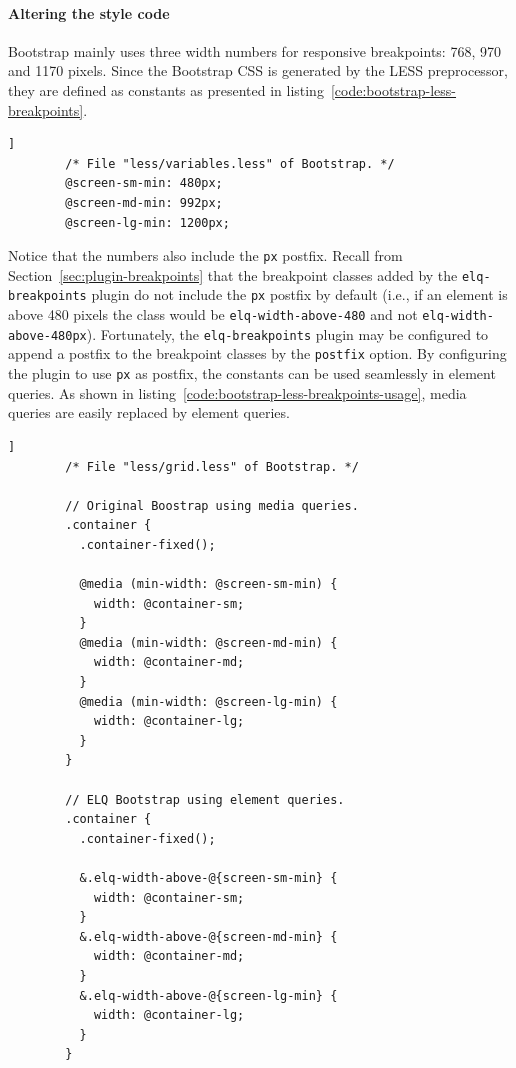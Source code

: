 \documentclass[a4paper,11pt]{kth-mag}
\newcommand{\code}[1]{\texttt{#1}}
\begin{document}
      \paragraph{Altering the style code}
      \gls{Bootstrap} mainly uses three width numbers for \gls{responsive} breakpoints: 768, 970 and 1170 pixels.
      Since the \gls{Bootstrap} \gls{CSS} is generated by the \gls{LESS} preprocessor, they are defined as constants as presented in listing~\ref{code:bootstrap-less-breakpoints}.
      \begin{lstlisting}[gobble=8,label={code:bootstrap-less-breakpoints},caption={The main breakpoints used by \gls{Bootstrap} defined as \gls{LESS} constants.},captionpos=b]]
        /* File "less/variables.less" of Bootstrap. */
        @screen-sm-min: 480px;
        @screen-md-min: 992px;
        @screen-lg-min: 1200px;
      \end{lstlisting}
      Notice that the numbers also include the \code{px} postfix.
      Recall from Section~\ref{sec:plugin-breakpoints} that the breakpoint classes added by the \code{elq-breakpoints} plugin do not include the \code{px} postfix by default (i.e., if an element is above 480 pixels the class would be \code{elq-width-above-480} and not \code{elq-width-above-480px}).
      Fortunately, the \code{elq-breakpoints} plugin may be configured to append a postfix to the breakpoint classes by the \code{postfix} option.
      By configuring the plugin to use \code{px} as postfix, the constants can be used seamlessly in element queries.
      As shown in listing~\ref{code:bootstrap-less-breakpoints-usage}, \gls{media queries} are easily replaced by element queries.
      \begin{lstlisting}[gobble=8,label={code:bootstrap-less-breakpoints-usage},caption={Media queries can easily be replaced with element queries. By using the \code{elq-breakpoints} postfix option; the breakpoint constants can be used directly in the selectors. Notice that only three lines have been altered.},captionpos=b]]
        /* File "less/grid.less" of Bootstrap. */

        // Original Boostrap using media queries.
        .container {
          .container-fixed();

          @media (min-width: @screen-sm-min) {
            width: @container-sm;
          }
          @media (min-width: @screen-md-min) {
            width: @container-md;
          }
          @media (min-width: @screen-lg-min) {
            width: @container-lg;
          }
        }

        // ELQ Bootstrap using element queries.
        .container {
          .container-fixed();

          &.elq-width-above-@{screen-sm-min} {
            width: @container-sm;
          }
          &.elq-width-above-@{screen-md-min} {
            width: @container-md;
          }
          &.elq-width-above-@{screen-lg-min} {
            width: @container-lg;
          }
        }
      \end{lstlisting}
\end{document}
